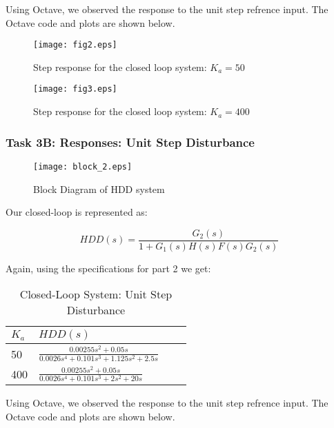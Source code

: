 \documentclass{article}
\newcommand{\matlab}[1]{%
%
}
\begin{document}
Using Octave, we observed the response to the unit step refrence input. The
Octave code and plots are shown below. 

\matlab{fig2.m}

\begin{figure}[H]
  \caption{Step response for the closed loop system: $K_a = 50$}
  \centering
  \texttt{[image: fig2.eps]}
\end{figure}

\matlab{fig3.m}

\begin{figure}[H]
  \caption{Step response for the closed loop system: $K_a = 400$}
  \centering
  \texttt{[image: fig3.eps]}
\end{figure}

\subsubsection*{Task 3B: Responses: Unit Step Disturbance}

\begin{figure}[H]
  \centering
  \caption{Block Diagram of HDD system}
  \texttt{[image: block\_2.eps]}
\end{figure}


Our closed-loop is represented as: 

$$ HDD(s) = \frac{G_2(s)}{1 + G_1(s)H(s)F(s)G_2(s)} $$ 

Again, using the specifications for part 2 we get:

\begin{table}[H]
\begin{center}
  \begin{tabular}{ | l | l | l | p{5cm} |}
  \hline
  \textbf{$K_a$} & \textbf{$HDD(s)$}  \\ \hline
  50 & $\frac{0.00255s^2 + 0.05s}{0.0026s^4 + 0.101s^3 + 1.125s^2 + 2.5s}$\\ \hline 
  400 & $\frac{0.00255s^2 + 0.05s}{0.0026s^4 + 0.101s^3 + 2s^2 + 20s}$\\ \hline 
 \end{tabular}
\end{center}
\caption{Closed-Loop System: Unit Step Disturbance}
\end{table}

Using Octave, we observed the response to the unit step refrence input. The
Octave code and plots are shown below. 

\matlab{fig4.m}
\end{document}

